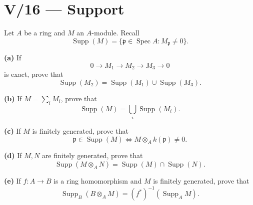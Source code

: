 \section*{V/16 --- Support}

\begin{problem}[CP-V-0028]
\label{prob:cp-v-0028}
Let \(A\) be a ring and \(M\) an \(A\)-module. Recall
\[
\operatorname{Supp}(M)
=
\{\mathfrak p\in\operatorname{Spec}A:M_{\mathfrak p}\ne0\}.
\]

\textbf{(a)} If
\[
0\to M_1\to M_2\to M_3\to0
\]
is exact, prove that
\[
\operatorname{Supp}(M_2)
=
\operatorname{Supp}(M_1)\cup\operatorname{Supp}(M_3).
\]

\textbf{(b)} If \(M=\sum_i M_i\), prove that
\[
\operatorname{Supp}(M)
=
\bigcup_i\operatorname{Supp}(M_i).
\]

\textbf{(c)} If \(M\) is finitely generated, prove that
\[
\mathfrak p\in\operatorname{Supp}(M)
\iff
M\otimes_A k(\mathfrak p)\ne0.
\]

\textbf{(d)} If \(M,N\) are finitely generated, prove that
\[
\operatorname{Supp}(M\otimes_A N)
=
\operatorname{Supp}(M)\cap\operatorname{Supp}(N).
\]

\textbf{(e)} If \(f:A\to B\) is a ring homomorphism and \(M\) is finitely
generated, prove that
\[
\operatorname{Supp}_B(B\otimes_A M)
=
(f^*)^{-1}(\operatorname{Supp}_A M).
\]
\end{problem}

